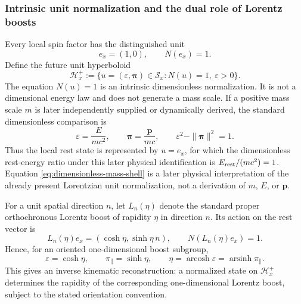 \documentclass[11pt,a4paper]{article}
\theoremstyle{remark}
\newcommand{\Smodel}{\mathcal S}
\begin{document}
\subsubsection*{Intrinsic unit normalization and the dual role of Lorentz boosts}

Every local spin factor has the distinguished unit
\begin{equation}
  e_x=(1,0),
  \qquad
  N(e_x)=1.
\tag{3.6}\label{eq:local-unit}
\end{equation}
Define the future unit hyperboloid
\begin{equation}
  \mathcal H_x^+
  :=\{u=(\varepsilon,\boldsymbol\pi)\in\Smodel_x:
      N(u)=1,\ \varepsilon>0\}.
\tag{3.7}\label{eq:unit-hyperboloid}
\end{equation}
The equation \(N(u)=1\) is an intrinsic dimensionless normalization.  It is not a dimensional energy law and does not generate a mass scale.  If a positive mass scale \(m\) is later independently supplied or dynamically derived, the standard dimensionless comparison is
\begin{equation}
  \varepsilon=\frac{E}{mc^2},
  \qquad
  \boldsymbol\pi=\frac{\mathbf p}{mc},
  \qquad
  \varepsilon^2-\|\boldsymbol\pi\|^2=1.
\tag{3.8}\label{eq:dimensionless-mass-shell}
\end{equation}
Thus the local rest state is represented by \(u=e_x\), for which the dimensionless rest-energy ratio under this later physical identification is \(E_{\rm rest}/(mc^2)=1\).  Equation \eqref{eq:dimensionless-mass-shell} is a later physical interpretation of the already present Lorentzian unit normalization, not a derivation of \(m\), \(E\), or \(\mathbf p\).

For a unit spatial direction \(n\), let \(L_n(\eta)\) denote the standard proper orthochronous Lorentz boost of rapidity \(\eta\) in direction \(n\).  Its action on the rest vector is
\begin{equation}
  L_n(\eta)e_x
  =(\cosh\eta,\sinh\eta\,n),
  \qquad
  N(L_n(\eta)e_x)=1.
\tag{3.9}\label{eq:standard-boost-mass-shell}
\end{equation}
Hence, for an oriented one-dimensional boost subgroup,
\begin{equation}
  \varepsilon=\cosh\eta,
  \qquad
  \pi_{\parallel}=\sinh\eta,
  \qquad
  \eta=\operatorname{arcosh}\varepsilon
       =\operatorname{arsinh}\pi_{\parallel}.
\tag{3.10}\label{eq:rapidity-inversion}
\end{equation}
This gives an inverse kinematic reconstruction: a normalized state on \(\mathcal H_x^+\) determines the rapidity of the corresponding one-dimensional Lorentz boost, subject to the stated orientation convention.
\end{document}
